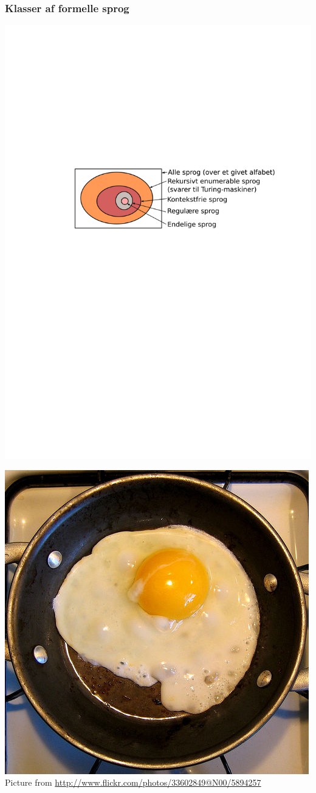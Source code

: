 \documentclass[]{beamer}
\begin{document}
\begin{frame}
\frametitle{Klasser af formelle sprog}
\begin{center}
    \includegraphics[width=1\textwidth]{images/1_seminar_fried_egg}
\end{center}
\pause
\includegraphics[width=.2\textwidth]{images/1_seminar_real_egg}\\
{\tiny Picture from \url{http://www.flickr.com/photos/33602849@N00/5894257}}
\end{frame}
\end{document}
